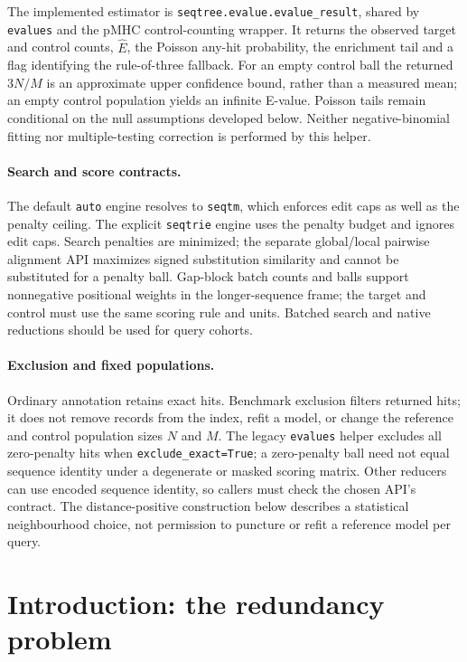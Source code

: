 \documentclass[11pt]{article}
\theoremstyle{oldplain}
\theoremstyle{oldrem}
\begin{document}
The implemented estimator is \texttt{seqtree.evalue.evalue\_result}, shared by
\texttt{evalues} and the pMHC control-counting wrapper.
It returns the observed target and control counts, $\widehat E$, the Poisson
any-hit probability, the enrichment tail and a flag identifying the rule-of-three fallback.
For an empty control ball the returned $3N/M$ is an approximate upper confidence
bound, rather than a measured mean; an empty control population yields an infinite E-value.
Poisson tails remain conditional on the null assumptions developed below.
Neither negative-binomial fitting nor multiple-testing correction is performed by this helper.

\paragraph{Search and score contracts.}
The default \texttt{auto} engine resolves to \texttt{seqtm}, which enforces edit caps
as well as the penalty ceiling.
The explicit \texttt{seqtrie} engine uses the penalty budget and ignores edit caps.
Search penalties are minimized; the separate global/local pairwise alignment API
maximizes signed substitution similarity and cannot be substituted for a penalty ball.
Gap-block batch counts and balls support nonnegative positional weights in the
longer-sequence frame; the target and control must use the same scoring rule and units.
Batched search and native reductions should be used for query cohorts.

\paragraph{Exclusion and fixed populations.}
Ordinary annotation retains exact hits.
Benchmark exclusion filters returned hits; it does not remove records from the index,
refit a model, or change the reference and control population sizes $N$ and $M$.
The legacy \texttt{evalues} helper excludes all zero-penalty hits when
\texttt{exclude\_exact=True}; a zero-penalty ball need not equal sequence identity
under a degenerate or masked scoring matrix.
Other reducers can use encoded sequence identity, so callers must check the chosen API's contract.
The distance-positive construction below describes a statistical neighbourhood choice,
not permission to puncture or refit a reference model per query.

\section{Introduction: the redundancy problem}
\end{document}
